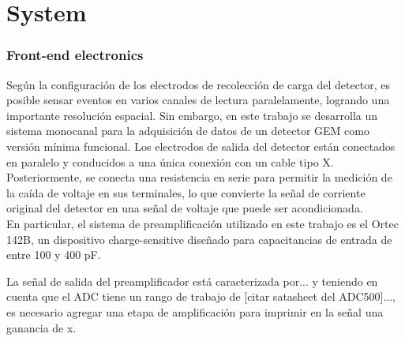 \documentclass[]{book}
\begin{document}
\chapter*{System}

\subsection*{Front-end electronics}
\noindent Según la configuración de los electrodos de recolección de carga del detector, es posible sensar eventos en varios canales de lectura paralelamente, logrando una importante resolución espacial. Sin embargo, en este trabajo se desarrolla un sistema monocanal para la adquisición de datos de un detector GEM como versión mínima funcional. Los electrodos de salida del detector están conectados en paralelo y conducidos a una única conexión con un cable tipo X. Posteriormente, se conecta una resistencia en serie para permitir la medición de la caída de voltaje en sus terminales, lo que convierte la señal de corriente original del detector en una señal de voltaje que puede ser acondicionada.\\


En particular, el sistema de preamplificación utilizado en este trabajo es el Ortec 142B, un dispositivo charge-sensitive diseñado para capacitancias de entrada de entre 100 y 400 pF. %

La señal de salida del preamplificador está caracterizada por... y teniendo en cuenta que el ADC tiene un rango de trabajo de [citar satasheet del ADC500]..., es necesario agregar una etapa de amplificación para imprimir en la señal una ganancia de x.\\
\end{document}
